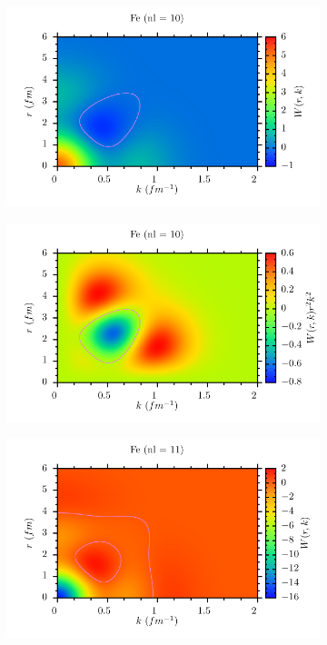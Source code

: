 \documentclass[11pt,twoside]{book}
\begin{document}
\begin{figure} 
\centering
 \begin{subfigure}[b]{0.49\textwidth} 
 	\includegraphics[width=\textwidth]{./figuren/Fe_wigner_10.pdf}  
 \end{subfigure}
 \begin{subfigure}[b]{0.49\textwidth} 
 	\includegraphics[width=\textwidth]{./figuren/Fe_wigner_10prob.pdf}  
 \end{subfigure} 
 \begin{subfigure}[b]{0.49\textwidth} 
 	\includegraphics[width=\textwidth]{./figuren/Fe_wigner_11.pdf}  

\end{subfigure}
\end{figure}
\end{document}
